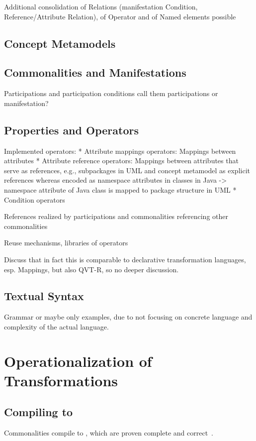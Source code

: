 Additional consolidation of Relations (manifestation Condition, Reference/Attribute Relation), of Operator and of Named elements possible

\subsection{Concept Metamodels}

\subsection{Commonalities and Manifestations}

Participations and participation conditions
call them participations or manifestation?

\subsection{Properties and Operators}
Implemented operators:
* Attribute mappings operators: Mappings between attributes
* Attribute reference operators: Mappings between attributes that serve as references, e.g., subpackages in UML and concept metamodel as explicit references whereas encoded as namespace attributes in classes in Java -> namespace attribute of Java class is mapped to package structure in UML
* Condition operators

References realized by participations and commonalities referencing other commonalities

Reuse mechanisms, libraries of operators

Discuss that in fact this is comparable to declarative transformation languages, esp. Mappings, but also QVT-R, so no deeper discussion.



\subsection{Textual Syntax}

Grammar or maybe only examples, due to not focusing on concrete language and complexity of the actual language.


\section{Operationalization of Transformations}

\subsection{Compiling to \reactions}
Commonalities compile to \reactions, which are proven complete and correct~\cite{kramer2017a}.


